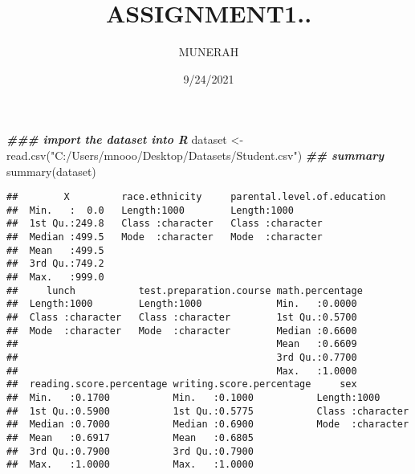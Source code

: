 \documentclass[
]{article}
\title{ASSIGNMENT1..}
\author{MUNERAH}
\date{9/24/2021}
\newenvironment{Shaded}{\begin{snugshade}}{\end{snugshade}}
\newcommand{\AttributeTok}[1]{\textcolor[rgb]{0.77,0.63,0.00}{#1}}
\newcommand{\DocumentationTok}[1]{\textcolor[rgb]{0.56,0.35,0.01}{\textbf{\textit{#1}}}}
\newcommand{\FunctionTok}[1]{\textcolor[rgb]{0.00,0.00,0.00}{#1}}
\newcommand{\NormalTok}[1]{#1}
\newcommand{\OtherTok}[1]{\textcolor[rgb]{0.56,0.35,0.01}{#1}}
\newcommand{\SpecialCharTok}[1]{\textcolor[rgb]{0.00,0.00,0.00}{#1}}
\newcommand{\StringTok}[1]{\textcolor[rgb]{0.31,0.60,0.02}{#1}}
\begin{document}
\maketitle

\begin{Shaded}
\begin{Highlighting}[]
\DocumentationTok{\#\#\# import the dataset into R }
\NormalTok{dataset }\OtherTok{\textless{}{-}}\FunctionTok{read.csv}\NormalTok{(}\StringTok{"C:/Users/mnooo/Desktop/Datasets/Student.csv"}\NormalTok{)}
\DocumentationTok{\#\# summary }
\FunctionTok{summary}\NormalTok{(dataset)}
\end{Highlighting}
\end{Shaded}

\begin{verbatim}
##        X         race.ethnicity     parental.level.of.education
##  Min.   :  0.0   Length:1000        Length:1000                
##  1st Qu.:249.8   Class :character   Class :character           
##  Median :499.5   Mode  :character   Mode  :character           
##  Mean   :499.5                                                 
##  3rd Qu.:749.2                                                 
##  Max.   :999.0                                                 
##     lunch           test.preparation.course math.percentage 
##  Length:1000        Length:1000             Min.   :0.0000  
##  Class :character   Class :character        1st Qu.:0.5700  
##  Mode  :character   Mode  :character        Median :0.6600  
##                                             Mean   :0.6609  
##                                             3rd Qu.:0.7700  
##                                             Max.   :1.0000  
##  reading.score.percentage writing.score.percentage     sex           
##  Min.   :0.1700           Min.   :0.1000           Length:1000       
##  1st Qu.:0.5900           1st Qu.:0.5775           Class :character  
##  Median :0.7000           Median :0.6900           Mode  :character  
##  Mean   :0.6917           Mean   :0.6805                             
##  3rd Qu.:0.7900           3rd Qu.:0.7900                             
##  Max.   :1.0000           Max.   :1.0000
\end{verbatim}

\begin{Shaded}
\end{Shaded}
\end{document}
